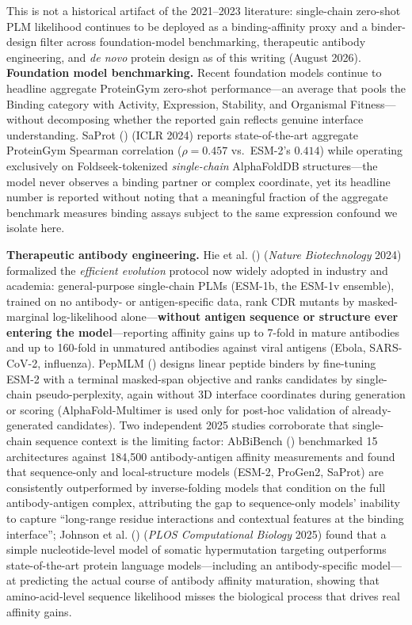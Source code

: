 \documentclass[
  11pt,
  us-letterpaper,
  DIV=11,
  numbers=noendperiod]{scrartcl}
\begin{document}
This is not a historical artifact of the 2021--2023 literature:
single-chain zero-shot PLM likelihood continues to be deployed as a
binding-affinity proxy and a binder-design filter across
foundation-model benchmarking, therapeutic antibody engineering, and
\emph{de novo} protein design as of this writing (August 2026).
\textbf{Foundation model benchmarking.} Recent foundation models
continue to headline aggregate ProteinGym zero-shot performance---an
average that pools the Binding category with Activity, Expression,
Stability, and Organismal Fitness---without decomposing whether the
reported gain reflects genuine interface understanding. SaProt
() (ICLR 2024) reports
state-of-the-art aggregate ProteinGym Spearman correlation
(\(\rho = 0.457\) vs.~ESM-2's \(0.414\)) while operating exclusively on
Foldseek-tokenized \emph{single-chain} AlphaFoldDB structures---the
model never observes a binding partner or complex coordinate, yet its
headline number is reported without noting that a meaningful fraction of
the aggregate benchmark measures binding assays subject to the same
expression confound we isolate here.

\textbf{Therapeutic antibody engineering.} Hie et al.
() (\emph{Nature
Biotechnology} 2024) formalized the \emph{efficient evolution} protocol
now widely adopted in industry and academia: general-purpose
single-chain PLMs (ESM-1b, the ESM-1v ensemble), trained on no antibody-
or antigen-specific data, rank CDR mutants by masked-marginal
log-likelihood alone---\textbf{without antigen sequence or structure
ever entering the model}---reporting affinity gains up to 7-fold in
mature antibodies and up to 160-fold in unmatured antibodies against
viral antigens (Ebola, SARS-CoV-2, influenza). PepMLM
() designs linear peptide
binders by fine-tuning ESM-2 with a terminal masked-span objective and
ranks candidates by single-chain pseudo-perplexity, again without 3D
interface coordinates during generation or scoring (AlphaFold-Multimer
is used only for post-hoc validation of already-generated candidates).
Two independent 2025 studies corroborate that single-chain sequence
context is the limiting factor: AbBiBench
() benchmarked 15
architectures against 184,500 antibody-antigen affinity measurements and
found that sequence-only and local-structure models (ESM-2, ProGen2,
SaProt) are consistently outperformed by inverse-folding models that
condition on the full antibody-antigen complex, attributing the gap to
sequence-only models' inability to capture ``long-range residue
interactions and contextual features at the binding interface''; Johnson
et al. ()
(\emph{PLOS Computational Biology} 2025) found that a simple
nucleotide-level model of somatic hypermutation targeting outperforms
state-of-the-art protein language models---including an
antibody-specific model---at predicting the actual course of antibody
affinity maturation, showing that amino-acid-level sequence likelihood
misses the biological process that drives real affinity gains.
\end{document}
